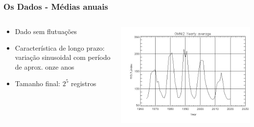 \documentclass{beamer}
\begin{document}
\begin{frame}
\frametitle{Os Dados - Médias anuais}
\begin{columns}
\begin{column}{0.4\textwidth}
\begin{itemize}
\item Dado sem flutuações
\item Característica de longo prazo: variação sinusoidal com período de aprox. onze anos
\item Tamanho final: $2^{5}$ registros
\end{itemize}
\end{column}
\begin{column}{0.6\textwidth}  %
    \begin{center}
     \includegraphics[scale=0.55]{Figuras/jpg_omni2_yearly_3G19RccK_m.jpg}
     \end{center}
\end{column}
\end{columns}
\end{frame}
\end{document}
